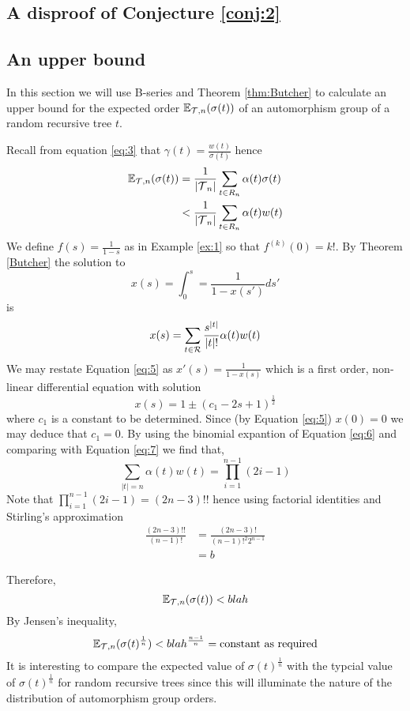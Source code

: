 \subsection{A disproof of Conjecture \ref{conj:2}}
\subsection{An upper bound}
In this section we will use B-series and Theorem \ref{thm:Butcher} to calculate an upper bound for the expected order 
$\mathbb{E}_{\operatorname{\mathcal{T}},n}(\sigma(t))$ of an automorphism group of a random recursive tree $t$.  

Recall from equation \ref{eq:3} that $\gamma(t) = \frac{w(t)}{\sigma(t)}$ hence
\begin{align}
 \mathbb{E}_{\operatorname{\mathcal{T}},n}(\sigma(t))  &= \frac{1}{\lvert \operatorname{\mathcal{T}}_n \rvert} \sum_{t \in R_n} \alpha(t)\sigma(t)  \\
 &< \frac{1}{\lvert \operatorname{\mathcal{T}}_n \rvert} \sum_{t \in R_n} \alpha(t)w(t)
\end{align}
We define $f(s)= \frac{1}{1-s}$ as in Example \ref{ex:1} so that  $f^{(k)}(0) = k!$.  By Theorem \ref{Butcher} the solution to 
\begin{equation}\label{eq:5}
 x(s) = \int_0^s = \frac{1}{1-x(s')} ds'
\end{equation}
is
\begin{equation}\label{eq:7}
 x(s) = \sum_{t \in \operatorname{\mathcal{R}}} \frac{s^{\lvert t \rvert}}{\lvert t \rvert !}\alpha(t)w(t)
\end{equation}
We may restate Equation \ref{eq:5} as $x'(s) = \frac{1}{1-x(s)}$ which is a first order, non-linear differential equation with 
solution
\begin{equation}\label{eq:6}
  x(s) = 1 \pm (c_1 -2s +1)^{\frac{1}{2}}
\end{equation}
where $c_1$ is a constant to be determined.  Since (by Equation \ref{eq:5}) $x(0) = 0$ we may deduce that $c_1 = 0$.  By using the 
binomial expantion of Equation \ref{eq:6} and comparing with Equation \ref{eq:7} we find that,
\[
 \sum_{\lvert t \rvert = n}\alpha(t)w(t) = \prod_{i=1}^{n-1} (2i-1)
\]
Note that $\prod_{i=1}^{n-1} (2i-1) = (2n-3)!!$ hence using factorial identities and Stirling's approximation 
\begin{align}
 \frac{(2n-3)!!}{(n-1)!} &= \frac{(2n - 3)!}{(n-1)!^2 2^{n-1}} \\
 & = b %
\end{align}

Therefore,
\[
 \mathbb{E}_{\operatorname{\mathcal{T}},n}(\sigma(t)) < blah 
\]
By Jensen's inequality,  %
\[
 \mathbb{E}_{\operatorname{\mathcal{T}},n}(\sigma(t)^{\frac{1}{n}}) < blah^{\frac{n-1}{n}} = \text{constant as required}
\]
It is interesting to compare the expected value of $\sigma(t)^{\frac{1}{n}}$ with the typcial value of $\sigma(t)^{\frac{1}{n}}$ 
for random recursive trees since this will illuminate the nature of the distribution of automorphism group orders.  
 
